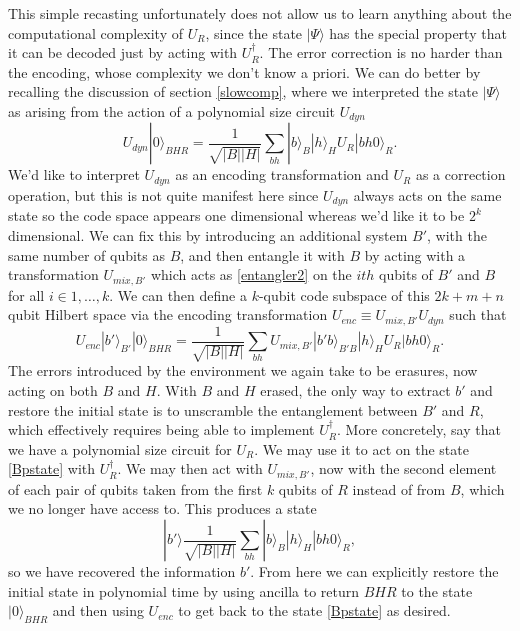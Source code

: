 \documentclass[12pt]{article}
\newcommand{\be}{\begin{equation}}
\newcommand{\ee}{\end{equation}}
\newcommand{\ran}{\rangle}
\begin{document}
This simple recasting unfortunately does not allow us to learn anything about the computational complexity of $U_R$, since the state $|\Psi\ran$ has the special property that it can be decoded just by acting with $U_R^\dagger$.  The error correction is no harder than the encoding, whose complexity we don't know a priori.  We can do better by recalling the discussion of section \ref{slowcomp}, where we interpreted the state $|\Psi\ran$ as arising from the action of a polynomial size circuit $U_{dyn}$
\be
U_{dyn}|0\ran_{BHR}=\frac{1}{\sqrt{|B||H|}}\sum_{bh}|b\ran_B |h\ran_HU_R|bh0\ran_R.
\ee
We'd like to interpret $U_{dyn}$ as an encoding transformation and $U_R$ as a correction operation, but this is not quite manifest here since $U_{dyn}$ always acts on the same state so the code space appears one dimensional whereas we'd like it to be $2^k$ dimensional.  We can fix this by introducing an additional system $B'$, with the same number of qubits as $B$, and then entangle it with $B$ by acting with a transformation $U_{mix,B'}$ which acts as \eqref{entangler2} on the $ith$ qubits of $B'$ and $B$ for all $i\in 1,\ldots,k$.  We can then define a $k$-qubit code subspace of this $2k+m+n$ qubit Hilbert space via the encoding transformation $U_{enc}\equiv U_{mix,B'}U_{dyn}$ such that
\be\label{Bpstate}
U_{enc}|b'\ran_{B'}|0\ran_{BHR}=\frac{1}{\sqrt{|B||H|}}\sum_{bh}U_{mix,B'}|b'b\ran_{B'B} |h\ran_HU_R|bh0\ran_R.
\ee
The errors introduced by the environment we again take to be erasures, now acting on both $B$ and $H$.  With $B$ and $H$ erased, the only way to extract $b'$ and restore the initial state is to unscramble the entanglement between $B'$ and $R$, which effectively requires being able to implement $U_R^\dagger$.  More concretely, say that we have a polynomial size circuit for $U_R$.  We may use it to act on the state \eqref{Bpstate} with $U_R^\dagger$.  We may then act with $U_{mix,B'}$, now with the second element of each pair of qubits taken from the first $k$ qubits of $R$ instead of from $B$, which we no longer have access to.  This produces a state
\be
|b'\ran\frac{1}{\sqrt{|B||H|}}\sum_{bh}|b\ran_B|h\ran_H|bh0\ran_R,
\ee 
so we have recovered the information $b'$.  From here we can explicitly restore the initial state in polynomial time by using ancilla to return $BHR$ to the state $|0\ran_{BHR}$ and then using $U_{enc}$ to get back to the state \eqref{Bpstate} as desired.  %
\end{document}
